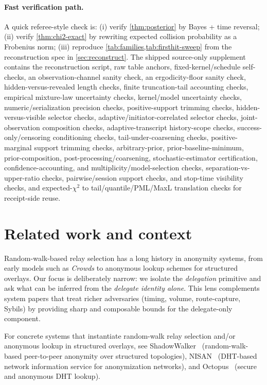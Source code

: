 \documentclass[11pt]{article}
\begin{document}
\paragraph{Fast verification path.}
A quick referee-style check is:
(i) verify \cref{thm:posterior} by Bayes + time reversal;
(ii) verify \cref{thm:chi2-exact} by rewriting expected collision probability as a Frobenius norm;
(iii) reproduce \cref{tab:families,tab:firsthit-sweep} from the reconstruction spec in \cref{sec:reconstruct}.
The shipped source-only supplement contains the reconstruction script, raw table anchors, fixed-kernel/schedule self-checks, an observation-channel sanity check, an ergodicity-floor sanity check, hidden-versus-revealed length checks, finite truncation-tail accounting checks, empirical mixture-law uncertainty checks, kernel/model uncertainty checks, numeric/serialization precision checks, positive-support trimming checks, hidden-versus-visible selector checks, adaptive/initiator-correlated selector checks, joint-observation composition checks, adaptive-transcript history-scope checks, success-only/censoring conditioning checks, tail-under-coarsening checks, positive-marginal support trimming checks, arbitrary-prior, prior-baseline-minimum, prior-composition, post-processing/coarsening, stochastic-estimator certification, confidence-accounting, and multiplicity/model-selection checks, separation-vs-upper-ratio checks, pairwise/session support checks, and stop-time visibility checks, and expected-$\chi^2$ to tail/quantile/PML/MaxL translation checks for receipt-side reuse.

\section{Related work and context}\label{sec:related}
Random-walk-based relay selection has a long history in anonymity systems, from
early models such as \emph{Crowds} to anonymous lookup schemes for structured
overlays. Our focus is deliberately narrow: we isolate the \emph{delegation}
primitive and ask what can be inferred from the \emph{delegate identity alone}.
This lens complements system papers that treat richer adversaries (timing,
volume, route-capture, Sybils) by providing sharp and composable bounds for the
delegate-only component.

For concrete systems that instantiate random-walk relay selection and/or anonymous lookup in structured overlays, see ShadowWalker~\cite{shadowwalker} (random-walk-based peer-to-peer anonymity over structured topologies), NISAN~\cite{nisan} (DHT-based network information service for anonymization networks), and Octopus~\cite{octopus} (secure and anonymous DHT lookup).
\end{document}
